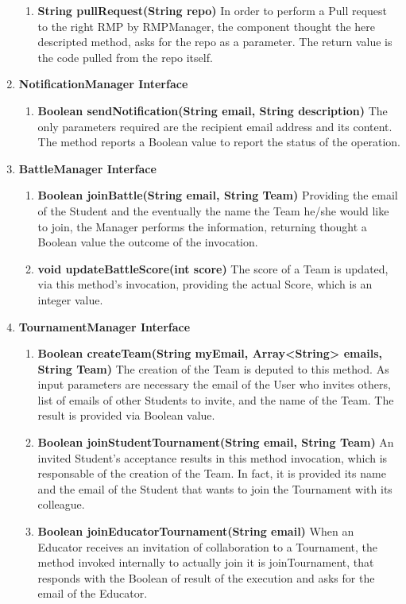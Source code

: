 \begin{enumerate}
\begin{enumerate}[label=$\bullet$]
            \item \textbf{String pullRequest(String repo)} In order to perform a Pull request to the right RMP by RMPManager, the component thought the here descripted method, asks for the repo as a parameter. The return value is the code pulled from the repo itself.
        \end{enumerate} 
    \item \textbf{NotificationManager Interface}
        \begin{enumerate}[label=$\bullet$]
            \item \textbf{Boolean sendNotification(String email, String description)} The only parameters required are the recipient email address and its content. The method reports a Boolean value to report the status of the operation.
        \end{enumerate}
    \item \textbf{BattleManager Interface}
        \begin{enumerate}[label=$\bullet$]
            \item \textbf{Boolean joinBattle(String email, String Team)} Providing the email of the Student and the eventually the name the Team he/she would like to join, the Manager performs the information, returning thought a Boolean value the outcome of the invocation.
            \item \textbf{void updateBattleScore(int score)} The score of a Team is updated, via this method's invocation, providing the actual Score, which is an integer value.
        \end{enumerate}
    \item \textbf{TournamentManager Interface}
        \begin{enumerate}[label=$\bullet$]
        \item \textbf{Boolean createTeam(String myEmail, Array<String> emails, String Team)} The creation of the Team is deputed to this method. As input parameters are necessary the email of the User who invites others, list of emails of other Students to invite, and the name of the Team. The result is provided via Boolean value. 
        \item \textbf{Boolean joinStudentTournament(String email, String Team)} An invited Student's acceptance results in this method invocation, which is responsable of the creation of the Team. In fact, it is provided its name and the email of the Student that wants to join the Tournament with its colleague.
        \item \textbf{Boolean joinEducatorTournament(String email)} When an Educator receives an invitation of collaboration to a Tournament, the method invoked internally to actually join it is joinTournament, that responds with the Boolean of result of the execution and asks for the email of the Educator.

\end{enumerate}
\end{enumerate}
